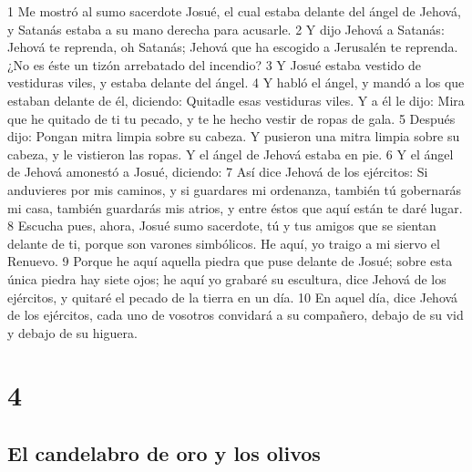 1 Me mostró al sumo sacerdote Josué, el cual estaba delante del ángel de Jehová, y Satanás estaba a su mano derecha para acusarle. 
2 Y dijo Jehová a Satanás: Jehová te reprenda, oh Satanás; Jehová que ha escogido a Jerusalén te reprenda. ¿No es éste un tizón arrebatado del incendio?
3 Y Josué estaba vestido de vestiduras viles, y estaba delante del ángel.
4 Y habló el ángel, y mandó a los que estaban delante de él, diciendo: Quitadle esas vestiduras viles. Y a él le dijo: Mira que he quitado de ti tu pecado, y te he hecho vestir de ropas de gala.
5 Después dijo: Pongan mitra limpia sobre su cabeza. Y pusieron una mitra limpia sobre su cabeza, y le vistieron las ropas. Y el ángel de Jehová estaba en pie.
6 Y el ángel de Jehová amonestó a Josué, diciendo:
7 Así dice Jehová de los ejércitos: Si anduvieres por mis caminos, y si guardares mi ordenanza, también tú gobernarás mi casa, también guardarás mis atrios, y entre éstos que aquí están te daré lugar.
8 Escucha pues, ahora, Josué sumo sacerdote, tú y tus amigos que se sientan delante de ti, porque son varones simbólicos. He aquí, yo traigo a mi siervo el Renuevo. 
9 Porque he aquí aquella piedra que puse delante de Josué; sobre esta única piedra hay siete ojos; he aquí yo grabaré su escultura, dice Jehová de los ejércitos, y quitaré el pecado de la tierra en un día.
10 En aquel día, dice Jehová de los ejércitos, cada uno de vosotros convidará a su compañero, debajo de su vid y debajo de su higuera. 

\chapter{4}

\section*{El candelabro de oro y los olivos}

